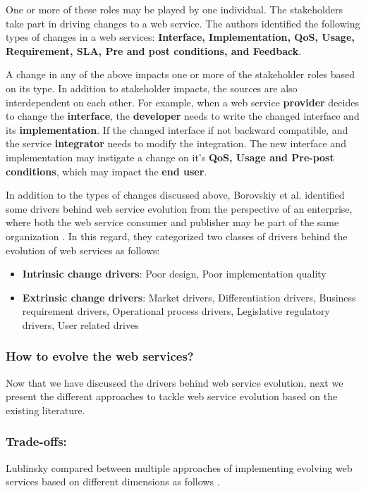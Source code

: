\documentclass[runningheads,a4paper]{llncs}
\begin{document}
One or more of these roles may be played by one individual. The stakeholders take part in driving changes to a web service. The authors identified the following types of changes in a web services: \textbf{Interface, Implementation, QoS, Usage, Requirement, SLA, Pre and post conditions, and Feedback}.

A change in any of the above impacts one or more of the stakeholder roles based on its type. In addition to stakeholder impacts, the sources are also interdependent on each other. For example, when a web service \textbf{provider} decides to change the \textbf{interface}, the \textbf{developer} needs to write the changed interface and its \textbf{implementation}. If the changed interface if not backward compatible, and the service \textbf{integrator} needs to modify the integration. The new interface and implementation may instigate a change on it’s \textbf{QoS, Usage and Pre-post conditions}, which may impact the \textbf{end user}.

In addition to the types of changes discussed above, Borovskiy et al. identified some drivers behind web service evolution from the perspective of an enterprise, where both the web service consumer and publisher may be part of the same organization \cite{borovskiy2008evolution}. In this regard, they categorized two classes of drivers behind the evolution of web services as follows:

\begin{itemize}
  \item \textbf{Intrinsic change drivers}: Poor design, Poor implementation quality
  \item \textbf{Extrinsic change drivers}: Market drivers, Differentiation drivers, Business requirement drivers, Operational process drivers, Legislative regulatory drivers, User related drives
\end{itemize}


\subsubsection{How to evolve the web services?} %
\label{sub:how_to_evolve_the_web_services_}
Now that we have discussed the drivers behind web service evolution, next we present the different approaches to tackle web service evolution based on the existing literature.

\subsubsection{Trade-offs:} %
Lublinsky compared between multiple approaches of implementing evolving web services based on different dimensions as follows \cite{lublinsky2007versioning}.
\end{document}
